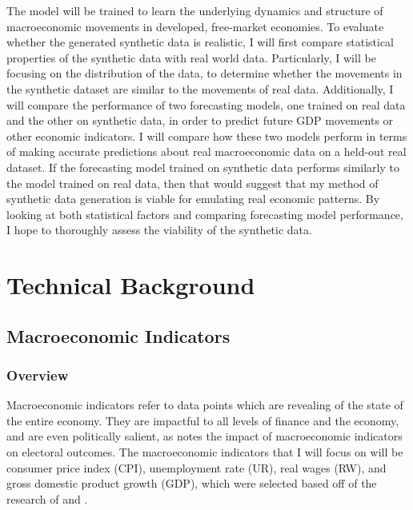 \documentclass[10pt,twocolumn]{article}
\begin{document}
The model will be trained to learn the underlying dynamics and structure of macroeconomic movements in developed, free-market economies. To evaluate whether the generated synthetic data is realistic, I will first compare statistical properties of the synthetic data with real world data. Particularly, I will be focusing on the distribution of the data, to determine whether the movements in the synthetic dataset are similar to the movements of real data. Additionally, I will compare the performance of two forecasting models, one trained on real data and the other on synthetic data, in order to predict future GDP movements or other economic indicators. I will compare how these two models perform in terms of making accurate predictions about real macroeconomic data on a held-out real dataset. If the forecasting model trained on synthetic data performs similarly to the model trained on real data, then that would suggest that my method of synthetic data generation is viable for emulating real economic patterns. By looking at both statistical factors and comparing forecasting model performance, I hope to thoroughly assess the viability of the synthetic data.

\section{Technical Background}

\subsection{Macroeconomic Indicators}

\subsubsection{Overview}
Macroeconomic indicators refer to data points which are revealing of the state of the entire economy. They are impactful to all levels of finance and the economy, and are even politically salient, as \textcite{ravallion2021macroeconomicmisery} notes the impact of macroeconomic indicators on electoral outcomes. The macroeconomic indicators that I will focus on will be consumer price index (CPI), unemployment rate (UR), real wages (RW), and gross domestic product growth (GDP), which were selected based off of the research of  \textcite{ravallion2021macroeconomicmisery} and \textcite{baltazar2020sustainableeconomies}.
\end{document}

